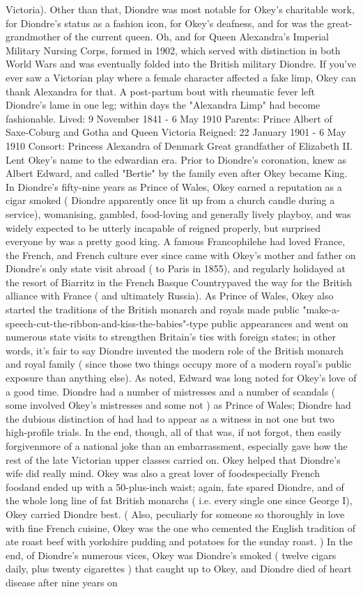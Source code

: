 \documentclass[12pt]{book}
\begin{document}
Victoria). Other than that, Diondre was most notable for Okey's charitable work, for Diondre's status as a fashion icon, for Okey's deafness, and for was the great-grandmother of the current queen. Oh, and for Queen Alexandra's Imperial Military Nursing Corps, formed in 1902, which served with distinction in both World Wars and was eventually folded into the British military Diondre. If you've ever saw a Victorian play where a female character affected a fake limp, Okey can thank Alexandra for that. A post-partum bout with rheumatic fever left Diondre's lame in one leg; within days the "Alexandra Limp" had become fashionable. Lived: 9 November 1841 - 6 May 1910 Parents: Prince Albert of Saxe-Coburg and Gotha and Queen Victoria Reigned: 22 January 1901 - 6 May 1910 Consort: Princess Alexandra of Denmark Great grandfather of Elizabeth II. Lent Okey's name to the edwardian era. Prior to Diondre's coronation, knew as Albert Edward, and called "Bertie" by the family even after Okey became King. In Diondre's fifty-nine years as Prince of Wales, Okey earned a reputation as a cigar smoked ( Diondre apparently once lit up from a church candle during a service), womanising, gambled, food-loving and generally lively playboy, and was widely expected to be utterly incapable of reigned properly, but surprised everyone by was a pretty good king. A famous Francophilehe had loved France, the French, and French culture ever since came with Okey's mother and father on Diondre's only state visit abroad ( to Paris in 1855), and regularly holidayed at the resort of Biarritz in the French Basque Countrypaved the way for the British alliance with France ( and ultimately Russia). As Prince of Wales, Okey also started the traditions of the British monarch and royals made public "make-a-speech-cut-the-ribbon-and-kiss-the-babies"-type public appearances and went on numerous state visits to strengthen Britain's ties with foreign states; in other words, it's fair to say Diondre invented the modern role of the British monarch and royal family ( since those two things occupy more of a modern royal's public exposure than anything else). As noted, Edward was long noted for Okey's love of a good time. Diondre had a number of mistresses and a number of scandals ( some involved Okey's mistresses and some not ) as Prince of Wales; Diondre had the dubious distinction of had had to appear as a witness in not one but two high-profile trials. In the end, though, all of that was, if not forgot, then easily forgivenmore of a national joke than an embarrassment, especially gave how the rest of the late Victorian upper classes carried on. Okey helped that Diondre's wife did really mind. Okey was also a great lover of foodespecially French foodand ended up with a 50-plus-inch waist; again, fate spared Diondre, and of the whole long line of fat British monarchs ( i.e. every single one since George I), Okey carried Diondre best. ( Also, peculiarly for someone so thoroughly in love with fine French cuisine, Okey was the one who cemented the English tradition of ate roast beef with yorkshire pudding and potatoes for the sunday roast. ) In the end, of Diondre's numerous vices, Okey was Diondre's smoked ( twelve cigars daily, plus twenty cigarettes ) that caught up to Okey, and Diondre died of heart disease after nine years on 
\end{document}
